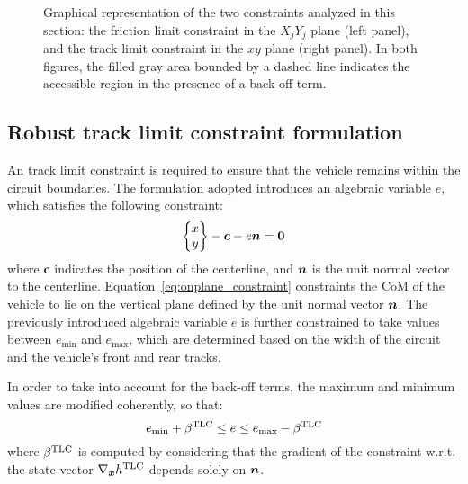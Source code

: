 \begin{figure}
	\centering
	\hfill
	\caption{Graphical representation of the two constraints analyzed in this section: the friction limit constraint in the $X_jY_j$ plane (left panel), and the track limit constraint in the $xy$ plane (right panel). In both figures, the filled gray area bounded by a dashed line indicates the accessible region in the presence of a back-off term.
	}
	\label{fig:robust_constraints}
\end{figure}

\subsection{Robust track limit constraint formulation}
\label{sec:TLC}
An track limit constraint is required to ensure that the vehicle remains within the circuit boundaries. The formulation adopted introduces an algebraic variable $e$, which satisfies the following constraint:
\begin{equation}
	\begin{Bmatrix}
		x\\y
	\end{Bmatrix}
	-\boldsymbol{c} - e\bn=\boldsymbol{0} \label{eq:onplane_constraint}
\end{equation}
where $\boldsymbol{c}$ indicates the position of the centerline, and $\boldsymbol{n}$ is the unit normal vector to the centerline. Equation~\eqref{eq:onplane_constraint} constraints the CoM of the vehicle to lie on the vertical plane defined by the unit normal vector $\boldsymbol{n}$. The previously introduced algebraic variable $e$ is further constrained to take values between $e_\textrm{min}$ and $e_\textrm{max}$, which are determined based on the width of the circuit and the vehicle's front and rear tracks.

In order to take into account for the back-off terms, the maximum and minimum values are modified coherently, so that:
\begin{equation}
	e_\textrm{min} + \be^\textrm{TLC} \leq e \leq e_\textrm{max} - \be^\textrm{TLC}\label{eq:TLC}
\end{equation}
where $\beta^\textrm{TLC}$ is computed by considering that the gradient of the constraint w.r.t. the state vector $\nabla_{\boldsymbol{x}}h^\textrm{TLC}$ depends solely on $\boldsymbol{n}$.
